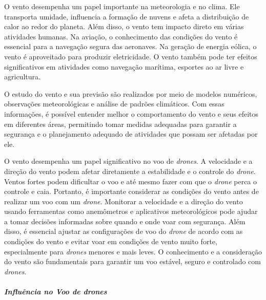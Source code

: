 \documentclass[a4paper, 12pt, onecolumn,singlespacing]{article}
\begin{document}
	
	O vento desempenha um papel importante na meteorologia e no clima. Ele transporta umidade, influencia a formação de nuvens e afeta a distribuição de calor ao redor do planeta. Além disso, o vento tem impacto direto em várias atividades humanas. Na aviação, o conhecimento das condições do vento é essencial para a navegação segura das aeronaves. Na geração de energia eólica, o vento é aproveitado para produzir eletricidade. O vento também pode ter efeitos significativos em atividades como navegação marítima, esportes ao ar livre e agricultura.
	
	O estudo do vento e sua previsão são realizados por meio de modelos numéricos, observações meteorológicas e análise de padrões climáticos. Com essas informações, é possível entender melhor o comportamento do vento e seus efeitos em diferentes áreas, permitindo tomar medidas adequadas para garantir a segurança e o planejamento adequado de atividades que possam ser afetadas por ele.
	
	O vento desempenha um papel significativo no voo de \textit{drones}. A velocidade e a direção do vento podem afetar diretamente a estabilidade e o controle do \textit{drone}. Ventos fortes podem dificultar o voo e até mesmo fazer com que o \textit{drone} perca o controle e caia. Portanto, é importante considerar as condições do vento antes de realizar um voo com um \textit{drone}. Monitorar a velocidade e a direção do vento usando ferramentas como anemômetros e aplicativos meteorológicos pode ajudar a tomar decisões informadas sobre quando e onde voar com segurança. Além disso, é essencial ajustar as configurações de voo do \textit{drone} de acordo com as condições do vento e evitar voar em condições de vento muito forte, especialmente para \textit{drones} menores e mais leves. O conhecimento e a consideração do vento são fundamentais para garantir um voo estável, seguro e controlado com \textit{drones}.
	
	\subparagraph{Influência no Voo de \textit{drones}}
	
\end{document}
